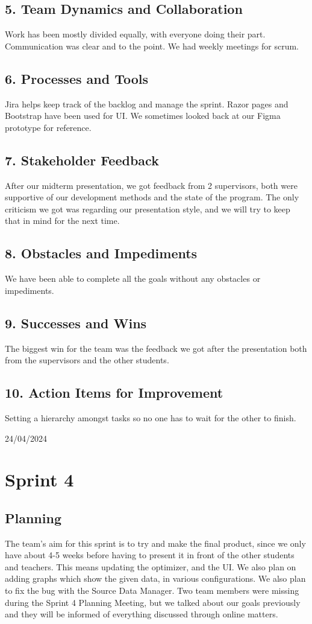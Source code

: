 \documentclass[12pt]{report}
\begin{document}
\subsection*{5. Team Dynamics and Collaboration}
Work has been mostly divided equally, with everyone doing their part. Communication was clear and to the point. We had weekly meetings for scrum.
\subsection*{6. Processes and Tools}
Jira helps keep track of the backlog and manage the sprint. Razor pages and Bootstrap have been used for UI. We sometimes looked back at our Figma prototype for reference.
\subsection*{7. Stakeholder Feedback}
After our midterm presentation, we got feedback from 2 supervisors, both were supportive of our development methods and the state of the program. The only criticism we got was regarding our presentation style, and we will try to keep that in mind for the next time.
\subsection*{8. Obstacles and Impediments}
We have been able to complete all the goals without any obstacles or impediments.
\subsection*{9. Successes and Wins}
The biggest win for the team was the feedback we got after the presentation both from the supervisors and the other students.
\subsection*{10. Action Items for Improvement}
Setting a hierarchy amongst tasks so no one has to wait for the other to finish.

\hfill 24/04/2024
\clearpage







\section{Sprint 4}
\subsection*{Planning}
The team's aim for this sprint is to try and make the final product, since we only have about 4-5 weeks before having to present it in front of the other students and teachers. This means updating the optimizer, and the UI. We also plan on adding graphs which show the given data, in various configurations. We also plan to fix the bug with the Source Data Manager. Two team members were missing during the Sprint 4 Planning Meeting, but we talked about our goals previously and they will be informed of everything discussed through online matters.
\end{document}
